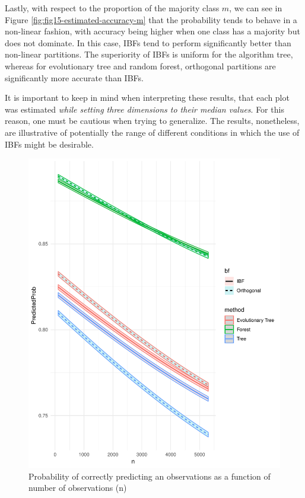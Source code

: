 \documentclass[]{elsarticle} %
\makeatletter
\def\maxwidth{\ifdim\Gin@nat@width>\linewidth\linewidth
\else\Gin@nat@width\fi}
\let\Oldincludegraphics\includegraphics
\renewcommand{\includegraphics}[1]{\Oldincludegraphics[width=\maxwidth]{#1}}
\makeatother
\begin{document}
Lastly, with respect to the proportion of the majority class \(m\), we
can see in Figure \ref{fig:fig15-estimated-accuracy-m} that the
probability tends to behave in a non-linear fashion, with accuracy being
higher when one class has a majority but does not dominate. In this
case, IBFs tend to perform significantly better than non-linear
partitions. The superiority of IBFs is uniform for the algorithm tree,
whereas for evolutionary tree and random forest, orthogonal partitions
are significantly more accurate than IBFs.

It is important to keep in mind when interpreting these results, that
each plot was estimated \emph{while setting three dimensions to their
median values}. For this reason, one must be cautious when trying to
generalize. The results, nonetheless, are illustrative of potentially
the range of different conditions in which the use of IBFs might be
desirable.

\begin{figure}[htbp]
\centering
\includegraphics{Trees_with_Base_Functions_v2_files/figure-latex/fig12-estimated-accuracy-n-1.pdf}
\caption{\label{fig:fig12-estimated-accuracy-n}Probability of correctly
predicting an observations as a function of number of observations (n)}
\end{figure}
\end{document}
